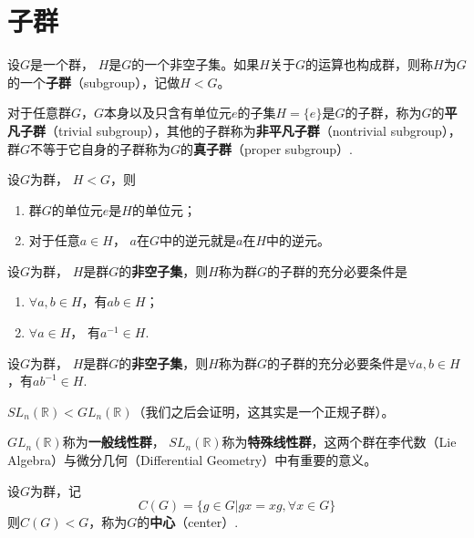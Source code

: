\section{子群}
\begin{definition}\label{subgroup}
	设$G$是一个群， $H$是$G$的一个非空子集。如果$H$关于$G$的运算也构成群，则称$H$为$G$的一个\textbf{子群}（subgroup），记做$H<G$。
\end{definition}
\begin{example}
	对于任意群$G$，$G$本身以及只含有单位元$e$的子集$H = \{e\}$是$G$的子群，称为$G$的\textbf{平凡子群}（trivial subgroup），其他的子群称为\textbf{非平凡子群}（nontrivial subgroup），群$G$不等于它自身的子群称为$G$的\textbf{真子群}（proper subgroup）.
\end{example}
\begin{theorem}
	设$G$为群， $H<G$，则
	\begin{enumerate}
		\item 群$G$的单位元$e$是$H$的单位元；
		\item 对于任意$a\in H$， $a$在$G$中的逆元就是$a$在$H$中的逆元。
	\end{enumerate}
\end{theorem}
\begin{theorem}[子群的判别准则之一]
	设$G$为群， $H$是群$G$的\textbf{非空子集}，则$H$称为群$G$的子群的充分必要条件是
	\begin{enumerate}
		\item $\forall a, b\in H$，有$ab\in H$；
		\item $\forall a\in H$， 有$a^{-1}\in H$.
	\end{enumerate}
\end{theorem}
\begin{theorem}
		设$G$为群， $H$是群$G$的\textbf{非空子集}，则$H$称为群$G$的子群的充分必要条件是$\forall a, b\in H$，有$ab^{-1}\in H$.
\end{theorem}
\begin{example}
	$SL_n(\mathbb R) < GL_n(\mathbb R)$（我们之后会证明，这其实是一个正规子群）。
\end{example}
\begin{note}
	$GL_n(\mathbb R)$称为\textbf{一般线性群}， $SL_n(\mathbb R)$称为\textbf{特殊线性群}，这两个群在李代数（Lie Algebra）与微分几何（Differential Geometry）中有重要的意义。
\end{note}
\begin{example}
	设$G$为群，记
	\begin{equation}
		C(G) = \{g\in G| gx=xg,\forall x\in G\}
	\end{equation}
	则$C(G)<G$，称为$G$的\textbf{中心}（center）.
\end{example}
